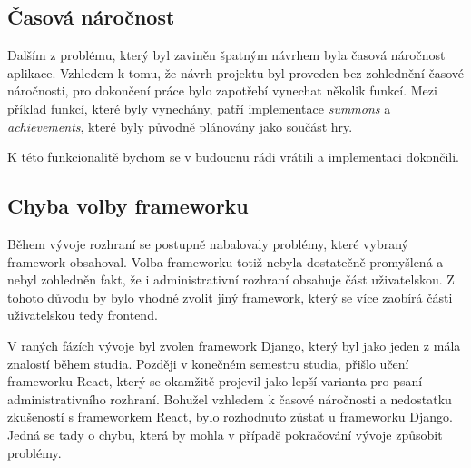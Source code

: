 \subsection*{Časová náročnost}
\label{subsec:implementation-problems-time}
Dalším z problému, který byl zaviněn špatným návrhem byla časová náročnost aplikace. Vzhledem k tomu, že návrh projektu byl proveden bez zohlednění časové náročnosti, pro dokončení práce bylo zapotřebí vynechat několik funkcí. Mezi příklad funkcí, které byly vynechány, patří implementace \textit{summons} a \textit{achievements}, které byly původně plánovány jako součást hry.

K této funkcionalitě bychom se v budoucnu rádi vrátili a implementaci dokončili.

\subsection*{Chyba volby frameworku}
\label{subsec:implementation-problems-framework}
Během vývoje rozhraní se postupně nabalovaly problémy, které vybraný framework obsahoval. Volba frameworku totiž nebyla dostatečně promyšlená a nebyl zohledněn fakt, že i administrativní rozhraní obsahuje část uživatelskou. Z tohoto důvodu by bylo vhodné zvolit jiný framework, který se více zaobírá části uživatelskou tedy frontend.

V raných fázích vývoje byl zvolen framework Django, který byl jako jeden z mála znalostí během studia. Později v konečném semestru studia, přišlo učení frameworku React, který se okamžitě projevil jako lepší varianta pro psaní administrativního rozhraní. Bohužel vzhledem k časové náročnosti a nedostatku zkušeností s frameworkem React, bylo rozhodnuto zůstat u frameworku Django. Jedná se tady o chybu, která by mohla v případě pokračování vývoje způsobit problémy.

\endinput